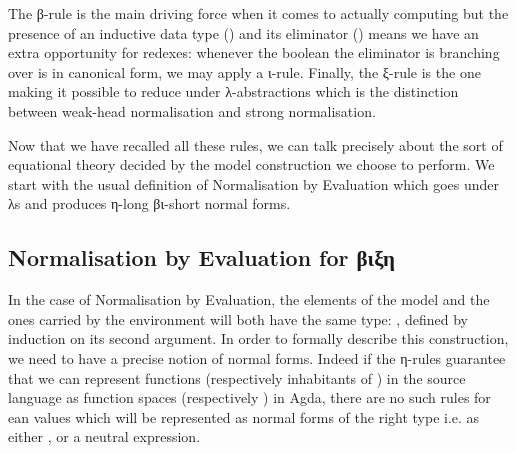 \noindent\begin{minipage}[t]{0.55\textwidth}
\end{minipage}
\begin{minipage}[t]{0.45\textwidth}
\begin{mathpar}
\end{mathpar}
\end{minipage}

The β-rule is the main driving force when it comes to actually computing
but the presence of an inductive data type () and its eliminator
() means we have an extra opportunity for redexes: whenever the
boolean the eliminator is branching over is in canonical form, we may apply
a ι-rule. Finally, the ξ-rule is the one making it possible to reduce under
λ-abstractions which is the distinction between weak-head normalisation and
strong normalisation.

Now that we have recalled all these rules, we can talk precisely
about the sort of equational theory decided by the model construction
we choose to perform. We start with the usual definition of Normalisation
by Evaluation which goes under λs and produces η-long βι-short normal
forms.

\subsection{Normalisation by Evaluation for βιξη}
\label{nbe}

In the case of Normalisation by Evaluation, the elements of the model
and the ones carried by the environment will both have the same type:
, defined by induction on its second argument. In
order to formally describe this construction, we need to have a precise
notion of normal forms. Indeed if the η-rules guarantee that we can
represent functions (respectively inhabitants of ) in the
source language as function spaces (respectively ) in Agda, there
are no such rules for ean values which will be represented
as normal forms of the right type i.e. as either , 
or a neutral expression.

